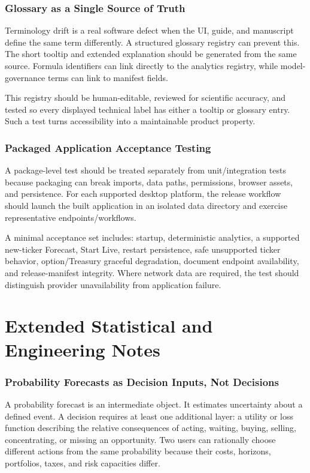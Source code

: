 \documentclass[11pt]{article}
\begin{document}
\section{Glossary as a Single Source of Truth}
Terminology drift is a real software defect when the UI, guide, and manuscript define the same term differently. A structured glossary registry can prevent this. The short tooltip and extended explanation should be generated from the same source. Formula identifiers can link directly to the analytics registry, while model-governance terms can link to manifest fields.

This registry should be human-editable, reviewed for scientific accuracy, and tested so every displayed technical label has either a tooltip or glossary entry. Such a test turns accessibility into a maintainable product property.

\section{Packaged Application Acceptance Testing}
A package-level test should be treated separately from unit/integration tests because packaging can break imports, data paths, permissions, browser assets, and persistence. For each supported desktop platform, the release workflow should launch the built application in an isolated data directory and exercise representative endpoints/workflows.

A minimal acceptance set includes: startup, deterministic analytics, a supported new-ticker Forecast, Start Live, restart persistence, safe unsupported ticker behavior, option/Treasury graceful degradation, document endpoint availability, and release-manifest integrity. Where network data are required, the test should distinguish provider unavailability from application failure.


\setcounter{section}{0}
\renewcommand{\thesection}{\arabic{section}}

\clearpage
\part{Extended Statistical and Engineering Notes}

\section{Probability Forecasts as Decision Inputs, Not Decisions}
A probability forecast is an intermediate object. It estimates uncertainty about a defined event. A decision requires at least one additional layer: a utility or loss function describing the relative consequences of acting, waiting, buying, selling, concentrating, or missing an opportunity. Two users can rationally choose different actions from the same probability because their costs, horizons, portfolios, taxes, and risk capacities differ.
\end{document}
